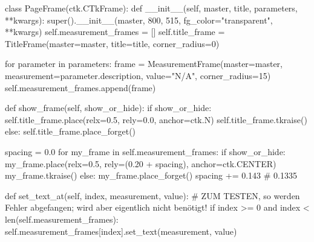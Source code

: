 \begin{pythoncode}
class PageFrame(ctk.CTkFrame):
	def __init__(self, master, title, parameters, **kwargs):
		super().__init__(master, 800, 515, fg_color="transparent", **kwargs)
		self.measurement_frames = []
		self.title_frame = TitleFrame(master=master, title=title, corner_radius=0)
		
		for parameter in parameters:
			frame = MeasurementFrame(master=master, measurement=parameter.description, value="N/A", corner_radius=15)
			self.measurement_frames.append(frame)
			
	def show_frame(self, show_or_hide):
		if show_or_hide:
			self.title_frame.place(relx=0.5, rely=0.0, anchor=ctk.N)
			self.title_frame.tkraise()
		else:
			self.title_frame.place_forget()
		
		spacing = 0.0
		for my_frame in self.measurement_frames:
			if show_or_hide:
				my_frame.place(relx=0.5, rely=(0.20 + spacing), anchor=ctk.CENTER)
				my_frame.tkraise()
			else:
				my_frame.place_forget()
			spacing += 0.143  # 0.1335
	
	def set_text_at(self, index, measurement, value):
		# ZUM TESTEN, so werden Fehler abgefangen; wird aber eigentlich nicht benötigt!
		if index >= 0 and index < len(self.measurement_frames):
			self.measurement_frames[index].set_text(measurement, value)
\end{pythoncode}


